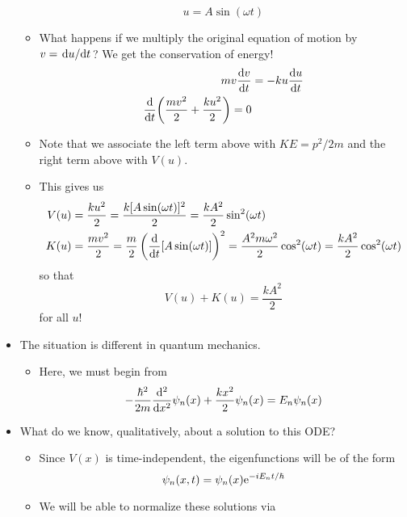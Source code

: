 \documentclass[../notes.tex]{subfiles}
\begin{document}
\begin{itemize}
\begin{itemize}
\begin{equation*}
            u = A\sin(\omega t)
        \end{equation*}
        \item What happens if we multiply the original equation of motion by $v=\dv*{u}{t}$? We get the conservation of energy!
        \begin{align*}
            mv\dv{v}{t} &= -ku\dv{u}{t}\\
            \dv{t}(\frac{mv^2}{2}+\frac{ku^2}{2}) = 0
        \end{align*}
        \item Note that we associate the left term above with $KE=p^2/2m$ and the right term above with $V(u)$.
        \item This gives us
        \begin{align*}
            V(u) &= \frac{ku^2}{2}
                = \frac{k[A\sin(\omega t)]^2}{2}
                = \frac{kA^2}{2}\sin^2(\omega t)\\
            K(u) &= \frac{mv^2}{2}
                = \frac{m}{2}\left( \dv{t}[A\sin(\omega t)] \right)^2
                = \frac{A^2m\omega^2}{2}\cos^2(\omega t)
                = \frac{kA^2}{2}\cos^2(\omega t)
        \end{align*}
        so that
        \begin{equation*}
            V(u)+K(u) = \frac{kA^2}{2}
        \end{equation*}
        for all $u$!
    \end{itemize}
    \item The situation is different in quantum mechanics.
    \begin{itemize}
        \item Here, we must begin from
        \begin{equation*}
            -\frac{\hbar^2}{2m}\dv[2]{x}\psi_n(x)+\frac{kx^2}{2}\psi_n(x) = E_n\psi_n(x)
        \end{equation*}
    \end{itemize}
    \item What do we know, qualitatively, about a solution to this ODE?
    \begin{itemize}
        \item Since $V(x)$ is time-independent, the eigenfunctions will be of the form
        \begin{equation*}
            \psi_n(x,t) = \psi_n(x)\e[-iE_nt/\hbar]
        \end{equation*}
        \item We will be able to normalize these solutions via

\end{itemize}
\end{itemize}
\end{document}
